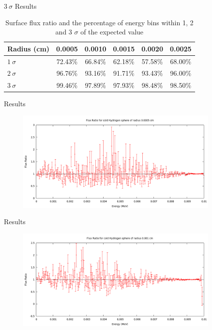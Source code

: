 \documentclass{beamer}
\begin{document}
\begin{frame}{$3~\sigma$ Results}

\begin{table}
\begin{tabular}{l | c | c | c | c | c}
Radius (cm) & 0.0005 & 0.0010 & 0.0015 & 0.0020 & 0.0025 \\
\hline \hline
$1 ~\sigma $ & 72.43\% & 66.84\% & 62.18\% & 57.58\% & 68.00\% \\ 
$2 ~\sigma$ & 96.76\% & 93.16\% & 91.71\% & 93.43\% & 96.00\% \\ 
$3 ~\sigma$ & 99.46\% & 97.89\% & 97.93\% & 98.48\% & 98.50\%
\end{tabular}
\caption{\centering Surface flux ratio and the percentage of energy bins within 1, 2 and 3 $\sigma$ of the expected value}
\end{table}
    
\end{frame}

\begin{frame}{Results}

  \begin{figure}
     \centering
     \includegraphics[width = 0.9\textwidth]{./Sphere1.png}
  \end{figure}


\end{frame}

\begin{frame}{Results}

  \begin{figure}
     \centering
     \includegraphics[width = 0.9\textwidth]{./Sphere2.png}
  \end{figure}


\end{frame}
\end{document}
